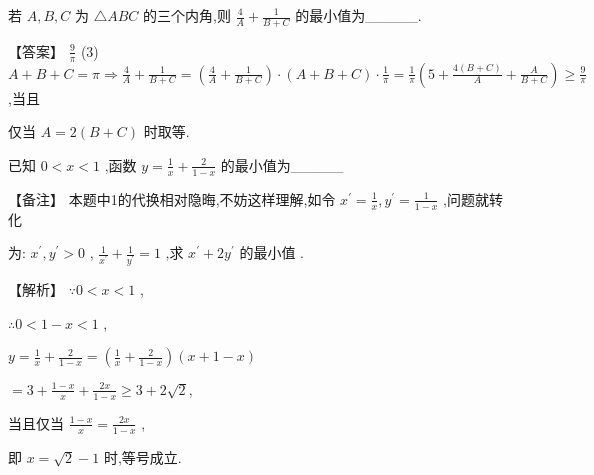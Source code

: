 \documentclass[11pt,a4paper]{article}
\begin{document}
\begin{problem} 
若 \(\displaystyle A,B,C\) 为 \(\displaystyle \triangle  {ABC}\) 的三个内角,则 \(\displaystyle \frac{4}{A} + \frac{1}{B + C}\) 的最小值为\_\_\_\_\_. 
\begin{jiexi}

【答案】 \(\displaystyle \frac{9}{\pi }\) (3) \(\displaystyle A + B + C = \pi  \Rightarrow  \frac{4}{A} + \frac{1}{B + C} = \left( {\frac{4}{A} + \frac{1}{B + C}}\right)  \cdot  \left( {A + B + C}\right)  \cdot  \frac{1}{\pi } = \frac{1}{\pi }\left( {5 + \frac{4\left( {B + C}\right) }{A} + \frac{A}{B + C}}\right)  \geq  \frac{9}{\pi }\) ,当且

仅当 \(\displaystyle A = 2\left( {B + C}\right)\) 时取等.


\end{jiexi}
\end{problem}
\begin{problem} 
已知 \(\displaystyle 0 < x < 1\) ,函数 \(\displaystyle y = \frac{1}{x} + \frac{2}{1 - x}\) 的最小值为\_\_\_\_\_
\begin{jiexi}
【备注】 本题中1的代换相对隐晦,不妨这样理解,如令 \(\displaystyle {x}^{\prime } = \frac{1}{x},{y}^{\prime } = \frac{1}{1 - x}\) ,问题就转化

为: \(\displaystyle {x}^{\prime },{y}^{\prime } > 0\) , \(\displaystyle \frac{1}{{x}^{\prime }} + \frac{1}{{y}^{\prime }} = 1\) ,求 \(\displaystyle {x}^{\prime } + 2{y}^{\prime }\) 的最小值 .

【解析】 \(\displaystyle \because 0 < x < 1\) ,

\(\displaystyle \therefore 0 < 1 - x < 1\) ,

\(\displaystyle y = \frac{1}{x} + \frac{2}{1 - x} = \left( {\frac{1}{x} + \frac{2}{1 - x}}\right) \left( {x + 1 - x}\right)\)

\(\displaystyle = 3 + \frac{1 - x}{x} + \frac{2x}{1 - x} \geq  3 + 2\sqrt{2},\)

当且仅当 \(\displaystyle \frac{1 - x}{x} = \frac{2x}{1 - x}\) ,

即 \(\displaystyle x = \sqrt{2} - 1\) 时,等号成立.


\end{jiexi}
\end{problem}
\end{document}
